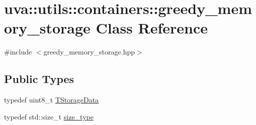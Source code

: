 \hypertarget{classuva_1_1utils_1_1containers_1_1greedy__memory__storage}{}\section{uva\+:\+:utils\+:\+:containers\+:\+:greedy\+\_\+memory\+\_\+storage Class Reference}
\label{classuva_1_1utils_1_1containers_1_1greedy__memory__storage}


{\ttfamily \#include $<$greedy\+\_\+memory\+\_\+storage.\+hpp$>$}

\subsection*{Public Types}
\begin{DoxyCompactItemize}
\item 
typedef uint8\+\_\+t \hyperlink{classuva_1_1utils_1_1containers_1_1greedy__memory__storage_acd823736297e88cc06a6e69f2c692af3}{T\+Storage\+Data}
\item 
typedef std\+::size\+\_\+t \hyperlink{classuva_1_1utils_1_1containers_1_1greedy__memory__storage_a50b3509335bfab9e81ac0ec31b3a21ca}{size\+\_\+type}
\end{DoxyCompactItemize}
